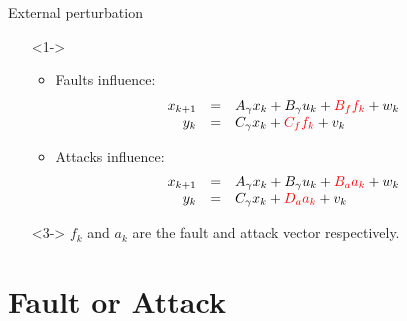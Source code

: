 \documentclass{beamer}
\def\itemizespace{\vspace{3mm}}
\begin{document}
\begin{frame}{External perturbation}
	\begin{itemize}
		\item[]<1->
		{
		\begin{itemize}
				\item \alert<+>
				{
					Faults influence:
					\[
						\begin{array}{rcl}
							x_{k+1}	& =	& A_\gamma x_k + B_\gamma u_k + \textcolor{red}{B_f f_k} + w_k \\
							y_k		& =	& C_\gamma x_k + \textcolor{red}{C_f f_k} + v_k \\
						\end{array} 
					\]
				}

				\itemizespace

				\item \alert<+>
				{
					Attacks influence:
					\[
						\begin{array}{rcl}
							x_{k+1}	& =	& A_\gamma x_k + B_\gamma u_k + \textcolor{red}{B_a a_k} + w_k \\
							y_k		& =	& C_\gamma x_k + \textcolor{red}{D_a a_k} + v_k \\
						\end{array} 
					\]
				}

			\end{itemize}
		}
		\item[]<3-> \alert {\small $f_k$ and $a_k$ are the fault and attack vector respectively.}
	\end{itemize}
\end{frame}


\section{Fault or Attack}
\end{document}
